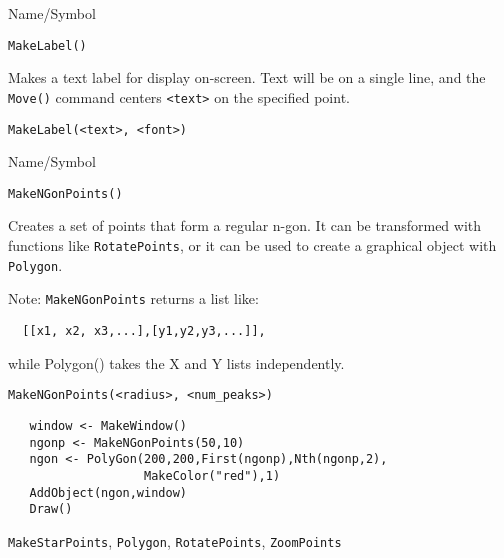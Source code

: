 \begin{desc}{Name/Symbol}
\item[Name/Symbol]	\verb+MakeLabel()+

\item[Description] Makes a text label for display on-screen. Text will
  be on a single line, and the \verb+Move()+ command centers
  \verb+<text>+ on the specified point.

\item[Usage]
\begin{verbatim}
MakeLabel(<text>, <font>)
\end{verbatim}

\item[Example]	

\item[See Also]	
\end{desc}
\begin{desc}{Name/Symbol}
\item[Name/Symbol]	\verb+MakeNGonPoints()+

\item[Description] 
Creates a set of points that form a regular n-gon.  It can be
transformed with functions like \verb+RotatePoints+, or it can be 
used to create a graphical object with \verb+Polygon+.

Note: \verb+MakeNGonPoints+ returns a list like:
\begin{verbatim}
  [[x1, x2, x3,...],[y1,y2,y3,...]],
\end{verbatim}
while Polygon() takes the X and Y lists independently.

\item[Usage]
\begin{verbatim}
MakeNGonPoints(<radius>, <num_peaks>)
\end{verbatim}

\item[Example]	
\begin{verbatim}
   window <- MakeWindow()
   ngonp <- MakeNGonPoints(50,10)
   ngon <- PolyGon(200,200,First(ngonp),Nth(ngonp,2),
                   MakeColor("red"),1)
   AddObject(ngon,window)
   Draw()
\end{verbatim}

\item[See Also]	
\verb+MakeStarPoints+, \verb+Polygon+, \verb+RotatePoints+, \verb+ZoomPoints+
\end{desc}

